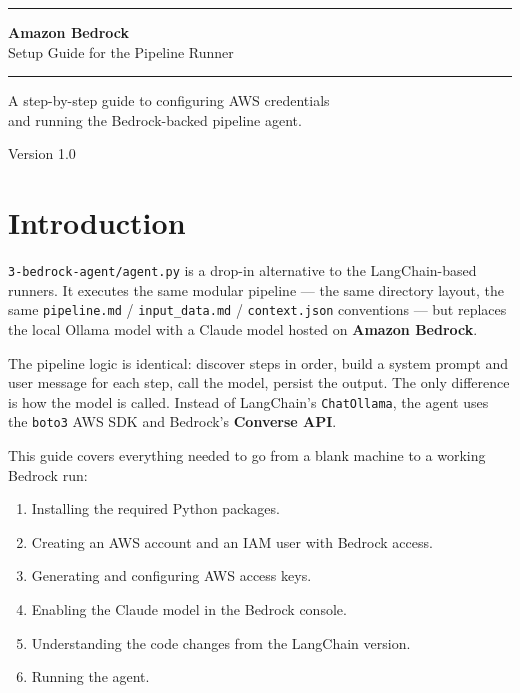 \documentclass[12pt, a4paper]{article}
\begin{document}
\begin{titlepage}
  \centering
  \vspace*{3cm}
  {\color{primary}\rule{\linewidth}{2pt}}
  \vspace{1cm}

  {\Huge\bfseries\color{darktext} Amazon Bedrock}\\[0.5em]
  {\Large\color{mutedtext} Setup Guide for the Pipeline Runner}

  \vspace{1cm}
  {\color{primary}\rule{\linewidth}{2pt}}

  \vspace{2cm}
  {\large\color{mutedtext}
    A step-by-step guide to configuring AWS credentials\\
    and running the Bedrock-backed pipeline agent.
  }

  \vfill
  {\small\color{mutedtext} Version 1.0}
\end{titlepage}

\tableofcontents
\newpage

\section{Introduction}

\texttt{3-bedrock-agent/agent.py} is a drop-in alternative to the LangChain-based runners. It executes the same modular pipeline — the same directory layout, the same \texttt{pipeline.md} / \texttt{input\_data.md} / \texttt{context.json} conventions — but replaces the local Ollama model with a Claude model hosted on \textbf{Amazon Bedrock}.

The pipeline logic is identical: discover steps in order, build a system prompt and user message for each step, call the model, persist the output. The only difference is how the model is called. Instead of LangChain's \texttt{ChatOllama}, the agent uses the \texttt{boto3} AWS SDK and Bedrock's \textbf{Converse API}.

This guide covers everything needed to go from a blank machine to a working Bedrock run:

\begin{enumerate}[leftmargin=1.5em]
  \item Installing the required Python packages.
  \item Creating an AWS account and an IAM user with Bedrock access.
  \item Generating and configuring AWS access keys.
  \item Enabling the Claude model in the Bedrock console.
  \item Understanding the code changes from the LangChain version.
  \item Running the agent.
\end{enumerate}
\end{document}

